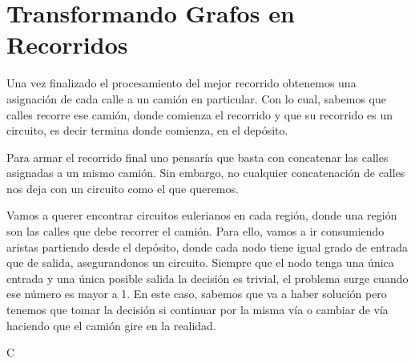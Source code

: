 \section{Transformando Grafos en Recorridos}

Una vez finalizado el procesamiento del mejor recorrido obtenemos una asignación de cada calle a un camión en particular. Con lo cual, sabemos que calles recorre ese camión, donde comienza el recorrido y que su recorrido es un circuito, es decir termina donde comienza, en el depósito.

\vspace{3mm}

Para armar el recorrido final uno pensaría que basta con concatenar las calles asignadas a un mismo camión. Sin embargo, no cualquier concatenación de calles nos deja con un circuito como el que queremos.

\vspace{3mm}

Vamos a querer encontrar circuitos eulerianos en cada región, donde una región son las calles que debe recorrer el camión. Para ello, vamos a ir consumiendo aristas partiendo desde el depósito, donde cada nodo tiene igual grado de entrada que de salida, asegurandonos un circuito. Siempre que el nodo tenga una única entrada y una única posible salida la decisión es trivial, el problema surge cuando ese número es mayor a 1. En este caso, sabemos que va a haber solución pero tenemos que tomar la decisión si continuar por la misma vía o cambiar de vía haciendo que el camión gire en la realidad.

\vspace{3mm}

C